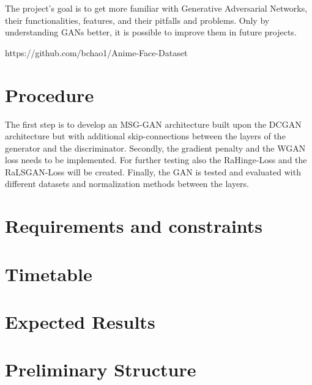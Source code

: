 \documentclass[conference,onecolumn,compsoc]{IEEEtran}
\begin{document}
\noindent
The project's goal is to get more familiar with Generative Adversarial Networks, their functionalities, features, and their pitfalls and problems. Only by understanding GANs better, it is possible to improve them in future projects.

https://github.com/bchao1/Anime-Face-Dataset


\section{Procedure}

\noindent
The first step is to develop an MSG-GAN \cite{karnewar2020msggan} architecture built upon the DCGAN \cite{radford2016unsupervised} architecture but with additional skip-connections between the layers of the generator and the discriminator. Secondly, the gradient penalty and the WGAN loss needs to be implemented. For further testing also the RaHinge-Loss and the RaLSGAN-Loss will be created. Finally, the GAN is tested and evaluated with different datasets and normalization methods between the layers.

\section{Requirements and constraints}

\blindtext

\section{Timetable}

\noindent
\blindtext \cite{yazıcı2019unusual}

\section{Expected Results}

\noindent
\blindtext


\section{Preliminary  Structure}
\end{document}
